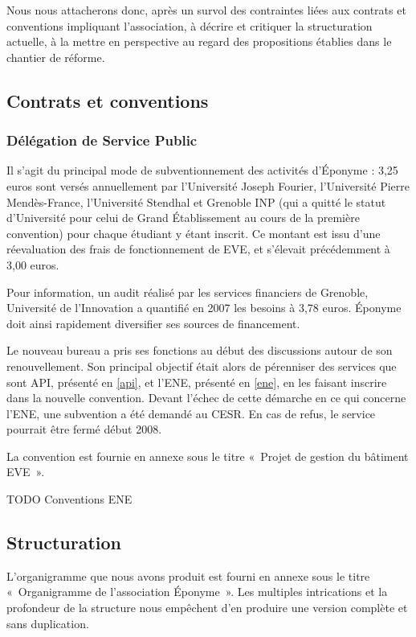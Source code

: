 Nous nous attacherons donc, après un survol des contraintes liées aux contrats
et conventions impliquant l'association, à décrire et critiquer la
structuration actuelle, à la mettre en perspective au regard des propositions
établies dans le chantier de réforme.

\subsection{Contrats et conventions}
\label{contrats}

\subsubsection{Délégation de Service Public}

Il s'agit du principal mode de subventionnement des activités d'Éponyme :
3,25 euros sont versés annuellement par l'Université Joseph Fourier,
l'Université Pierre Mendès-France, l'Université Stendhal et Grenoble INP
(qui a quitté le statut d'Université pour celui de Grand Établissement
 au cours de la première convention) pour chaque étudiant y étant inscrit.
Ce montant est issu d'une réevaluation des frais de fonctionnement de EVE,
et s'élevait précédemment à 3,00 euros.

Pour information, un audit réalisé par les services financiers de Grenoble,
Université de l'Innovation a quantifié en 2007 les besoins à 3,78 euros.
Éponyme doit ainsi rapidement diversifier ses sources de financement.

Le nouveau bureau a pris ses fonctions au début des discussions autour de
son renouvellement. Son principal objectif était alors de pérenniser des
services que sont API, présenté en \ref{api}, et l'ENE, présenté en \ref{ene},
en les faisant inscrire dans la nouvelle
convention. Devant l'échec de cette démarche en ce qui concerne l'ENE, une
subvention a été demandé au CESR. En cas de refus, le service pourrait être
fermé début 2008.

La convention est fournie en annexe sous le titre
«~Projet de gestion du bâtiment EVE~».

TODO Conventions ENE

\subsection{Structuration}
\label{structuration}

L'organigramme que nous avons produit est fourni en annexe sous le titre
«~Organigramme de l'association Éponyme~». Les multiples intrications et la
profondeur de la structure nous empêchent d'en produire une version complète
et sans duplication.

